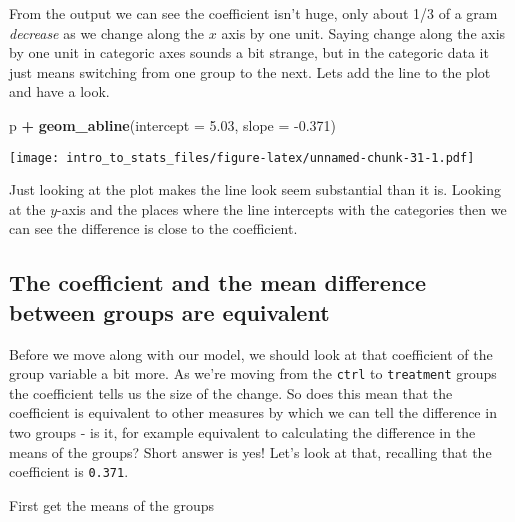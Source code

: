 \documentclass[]{book}
\newenvironment{Shaded}{\begin{snugshade}}{\end{snugshade}}
\newcommand{\DataTypeTok}[1]{\textcolor[rgb]{0.13,0.29,0.53}{#1}}
\newcommand{\FloatTok}[1]{\textcolor[rgb]{0.00,0.00,0.81}{#1}}
\newcommand{\KeywordTok}[1]{\textcolor[rgb]{0.13,0.29,0.53}{\textbf{#1}}}
\newcommand{\NormalTok}[1]{#1}
\newcommand{\OperatorTok}[1]{\textcolor[rgb]{0.81,0.36,0.00}{\textbf{#1}}}
\newcommand{\StringTok}[1]{\textcolor[rgb]{0.31,0.60,0.02}{#1}}
\begin{document}
From the output we can see the coefficient isn't huge, only about 1/3 of a gram \emph{decrease} as we change along the \(x\) axis by one unit. Saying change along the axis by one unit in categoric axes sounds a bit strange, but in the categoric data it just means switching from one group to the next. Lets add the line to the plot and have a look.

\begin{Shaded}
\begin{Highlighting}[]
\NormalTok{p }\OperatorTok{+}\StringTok{ }\KeywordTok{geom_abline}\NormalTok{(}\DataTypeTok{intercept =} \FloatTok{5.03}\NormalTok{, }\DataTypeTok{slope =} \FloatTok{-0.371}\NormalTok{)}
\end{Highlighting}
\end{Shaded}

\texttt{[image: intro\_to\_stats\_files/figure-latex/unnamed-chunk-31-1.pdf]}

Just looking at the plot makes the line look seem substantial than it is. Looking at the \(y\)-axis and the places where the line intercepts with the categories then we can see the difference is close to the coefficient.

\hypertarget{the-coefficient-and-the-mean-difference-between-groups-are-equivalent}{%
\subsection{The coefficient and the mean difference between groups are equivalent}\label{the-coefficient-and-the-mean-difference-between-groups-are-equivalent}}

Before we move along with our model, we should look at that coefficient of the group variable a bit more. As we're moving from the \texttt{ctrl} to \texttt{treatment} groups the coefficient tells us the size of the change. So does this mean that the coefficient is equivalent to other measures by which we can tell the difference in two groups - is it, for example equivalent to calculating the difference in the means of the groups? Short answer is yes! Let's look at that, recalling that the coefficient is \texttt{0.371}.

First get the means of the groups

\begin{Shaded}
\end{Shaded}
\end{document}
